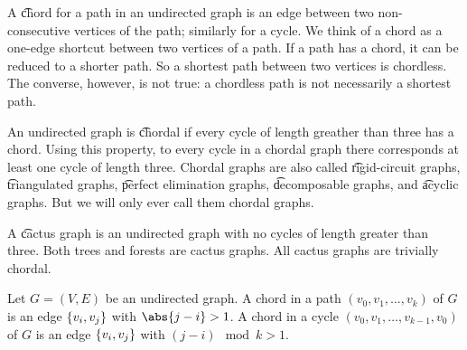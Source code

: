 
\sbasic
































\sstart
{}


A \t{chord} for a path in an undirected graph is an edge between two non-consecutive vertices of the path; similarly for a cycle.
We think of a chord as a one-edge shortcut between two vertices of a path.
If a path has a chord, it can be reduced to a shorter path.
So a shortest path between two vertices is chordless.
The converse, however, is not true: a chordless path is not necessarily a shortest path.

An undirected graph is \t{chordal} if every cycle of length greather than three has a chord.
Using this property, to every cycle in a chordal graph there corresponds at least one cycle of length three.
Chordal graphs are also called \t{rigid-circuit graphs}, \t{triangulated graphs}, \t{perfect elimination graphs}, \t{decomposable graphs}, and \t{acyclic graphs}.
But we will only ever call them chordal graphs.

A \t{cactus graph} is an undirected graph with no cycles of length greater than three.
Both trees and forests are cactus graphs.
All cactus graphs are trivially chordal.



Let $G = (V, E)$ be an undirected graph.
A chord in a path $(v_0, v_1, \dots, v_k)$ of $G$ is an edge $\{v_i, v_j\}$ with $\abs{j - i} > 1$.
A chord in a cycle $(v_0, v_1, \dots, v_{k-1}, v_0)$ of $G$ is an edge $\{v_i, v_j\}$ with $(j - i) \mod k > 1$.

